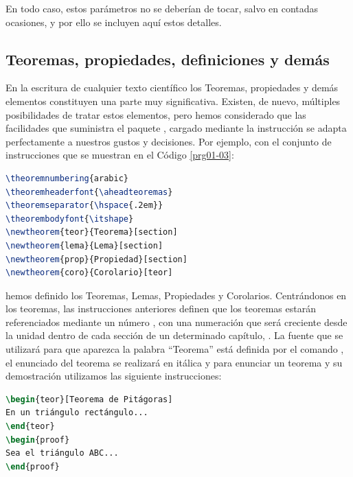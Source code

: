 En todo caso, estos parámetros no se deberían de tocar, salvo en contadas ocasiones, y por ello se incluyen aquí estos detalles.

\subsection{Teoremas, propiedades, definiciones y demás}
En la escritura de cualquier texto científico los Teoremas, propiedades y demás elementos constituyen una parte muy significativa. Existen, de nuevo, múltiples posibilidades de tratar estos elementos, pero hemos considerado que las facilidades que suministra el paquete , cargado mediante la instrucción  se adapta perfectamente a nuestros gustos y decisiones. Por ejemplo, con el conjunto de instrucciones que se muestran en  el Código \ref{prg01-03}:

\begin{lstlisting}[language=TeX,caption={Teoremas, Lemas,...}, breaklines=true, label=prg01-03]
\theoremnumbering{arabic}
\theoremheaderfont{\aheadteoremas}
\theoremseparator{\hspace{.2em}}
\theorembodyfont{\itshape}
\newtheorem{teor}{Teorema}[section]
\newtheorem{lema}{Lema}[section]
\newtheorem{prop}{Propiedad}[section]
\newtheorem{coro}{Corolario}[teor]
\end{lstlisting}

\noindent hemos definido los Teoremas, Lemas, Propiedades y Corolarios. Centrándonos en los teoremas, las instrucciones anteriores definen que los teoremas estarán referenciados mediante un número , con una numeración que será creciente desde la unidad dentro de cada sección de un determinado capítulo, \ttcolor{[section]}. La fuente que se utilizará para que aparezca la palabra ``Teorema'' está definida por el comando , el enunciado del teorema se realizará en itálica y para enunciar un teorema y su demostración utilizamos las siguiente instrucciones:

\begin{lstlisting}[language=TeX,caption={Teorema y Demostración}, breaklines=true, label=prg01-04]
\begin{teor}[Teorema de Pitágoras]
En un triángulo rectángulo...
\end{teor}
\begin{proof}
Sea el triángulo ABC...
\end{proof}
\end{lstlisting}

